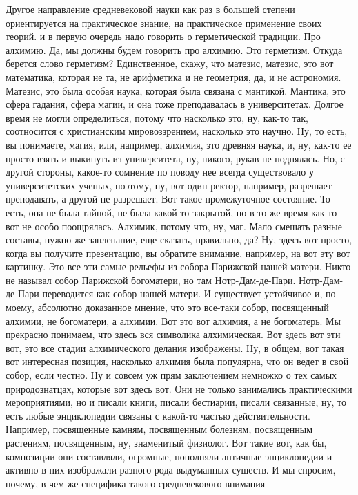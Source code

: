 Другое направление
средневековой науки как раз в большей степени ориентируется на практическое
знание, на практическое применение своих теорий. и в первую очередь надо
говорить о герметической традиции. Про
алхимию. Да, мы должны будем говорить про алхимию. Это герметизм. Откуда берется
слово герметизм? Единственное, скажу, что матезис, матезис,
это вот математика, которая не та, не арифметика и не геометрия, да, и не
астрономия. Матезис, это была особая наука, которая была связана с мантикой.
Мантика, это сфера гадания, сфера магии, и она тоже преподавалась в
университетах. Долгое время не могли определиться, потому что насколько это, ну,
как-то так, соотносится с христианским мировоззрением, насколько это научно. Ну,
то есть, вы понимаете, магия, или, например, алхимия, это древняя наука, и, ну,
как-то ее просто взять и выкинуть из университета, ну, никого, рукав не
поднялась. Но, с другой стороны, какое-то сомнение по поводу нее всегда
существовало у университетских ученых, поэтому, ну, вот один ректор, например,
разрешает преподавать, а другой не разрешает. Вот такое промежуточное состояние.
То есть, она не была тайной, не была какой-то закрытой, но в то же время как-то
вот не особо поощрялась. Алхимик, потому что, ну, маг. Мало смешать разные
составы, нужно же запленание, еще сказать, правильно, да? Ну, здесь вот просто,
когда вы получите презентацию, вы обратите внимание, например, на вот эту вот
картинку. Это все эти самые рельефы из собора Парижской нашей матери. Никто не
называл собор Парижской богоматери, но там Нотр-Дам-де-Пари. Нотр-Дам-де-Пари
переводится как собор нашей матери. И существует устойчивое и, по-моему,
абсолютно доказанное мнение, что это все-таки собор, посвященный алхимии, не
богоматери, а алхимии. Вот это вот алхимия, а не богоматерь. Мы прекрасно
понимаем, что здесь вся символика алхимическая. Вот здесь вот эти вот, это все
стадии алхимического делания изображены. Ну, в общем, вот такая вот интересная
позиция, насколько алхимия была популярна, что он ведет в свой собор, если
честно. Ну и совсем уж прям заключением немножко о тех самых природознатцах,
которые вот здесь вот. Они не только занимались практическими мероприятиями, но
и писали книги, писали бестиарии, писали связанные, ну, то есть любые
энциклопедии связаны с какой-то частью действительности. Например, посвященные
камням, посвященным болезням, посвященным растениям, посвященным, ну, знаменитый
физиолог. Вот такие вот, как бы, композиции они составляли, огромные, пополняли
античные энциклопедии и активно в них изображали разного рода выдуманных
существ. И мы спросим, почему, в чем же специфика такого средневекового внимания
